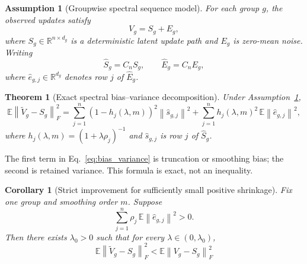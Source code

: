 \documentclass{article}
\newtheorem{theorem}{Theorem}
\newtheorem{corollary}{Corollary}
\newtheorem{assumption}{Assumption}
\newcommand{\RR}{\mathbb{R}}
\newcommand{\EE}{\mathbb{E}}
\newcommand{\norm}[1]{\left\lVert #1 \right\rVert}
\newcommand{\paren}[1]{\left( #1 \right)}
\begin{document}
\begin{assumption}[Groupwise spectral sequence model]
\label{ass:sequence}
For each group \(g\), the observed updates satisfy
\begin{equation}
V_g = S_g + E_g,
\label{eq:signal_model}
\end{equation}
where \(S_g \in \RR^{n\times d_g}\) is a deterministic latent update path and \(E_g\) is zero-mean noise. Writing
\[
\widehat S_g = C_n S_g,
\qquad
\widehat E_g = C_n E_g,
\]
where \(\widehat e_{g,j}\in \RR^{d_g}\) denotes row \(j\) of \(\widehat E_g\).
\end{assumption}

\begin{theorem}[Exact spectral bias--variance decomposition]
\label{thm:bias_variance}
Under Assumption~\ref{ass:sequence},
\begin{equation}
\EE \norm{\widetilde V_g - S_g}_F^2
=
\sum_{j=1}^{n}
\paren{1-h_j(\lambda,m)}^2
\norm{\widehat s_{g,j}}^2
+
\sum_{j=1}^{n}
h_j(\lambda,m)^2\,
\EE \norm{\widehat e_{g,j}}^2,
\label{eq:bias_variance}
\end{equation}
where \(h_j(\lambda,m) = (1+\lambda \rho_j)^{-1}\) and \(\widehat s_{g,j}\) is row \(j\) of \(\widehat S_g\).
\end{theorem}

The first term in Eq.~\eqref{eq:bias_variance} is truncation or smoothing bias; the second is retained variance. This formula is exact, not an inequality.

\begin{corollary}[Strict improvement for sufficiently small positive shrinkage]
\label{cor:strict_improvement}
Fix one group and smoothing order \(m\). Suppose
\begin{equation}
\sum_{j=1}^{n} \rho_j \, \EE\norm{\widehat e_{g,j}}^2 > 0.
\label{eq:strict_improvement_condition}
\end{equation}
Then there exists \(\lambda_0>0\) such that for every \(\lambda\in(0,\lambda_0)\),
\begin{equation}
\EE \norm{\widetilde V_g - S_g}_F^2
<
\EE \norm{V_g - S_g}_F^2
\label{eq:strict_improvement}
\end{equation}
\end{corollary}
\end{document}
